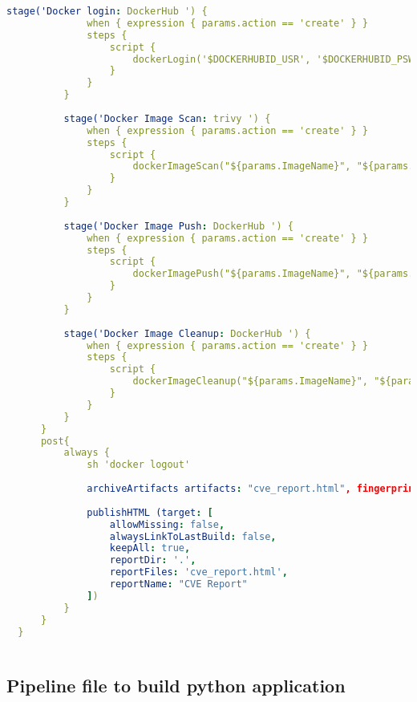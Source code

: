 \begin{lstlisting}[language=yaml, style=yamlstyle]
          stage('Docker login: DockerHub ') {
              when { expression { params.action == 'create' } }
              steps {
                  script {
                      dockerLogin('$DOCKERHUBID_USR', '$DOCKERHUBID_PSW')
                  }
              }
          }
  
          stage('Docker Image Scan: trivy ') {
              when { expression { params.action == 'create' } }
              steps {
                  script {
                      dockerImageScan("${params.ImageName}", "${params.ImageTag}", '$DOCKERHUBID_USR')
                  }
              }
          }
  
          stage('Docker Image Push: DockerHub ') {
              when { expression { params.action == 'create' } }
              steps {
                  script {
                      dockerImagePush("${params.ImageName}", "${params.ImageTag}", '$DOCKERHUBID_USR')
                  }
              }
          }
  
          stage('Docker Image Cleanup: DockerHub ') {
              when { expression { params.action == 'create' } }
              steps {
                  script {
                      dockerImageCleanup("${params.ImageName}", "${params.ImageTag}", '$DOCKERHUBID_USR')
                  }
              }
          }
      }
      post{
          always {
              sh 'docker logout'
  
              archiveArtifacts artifacts: "cve_report.html", fingerprint: true
  
              publishHTML (target: [
                  allowMissing: false,
                  alwaysLinkToLastBuild: false,
                  keepAll: true,
                  reportDir: '.',
                  reportFiles: 'cve_report.html',
                  reportName: "CVE Report"
              ])
          }
      }
  }
  
\end{lstlisting}

\subsection{
{Pipeline file to build python application}}
\label{sec:Pipeline bestand voor het bouwen van de python applicatie}

